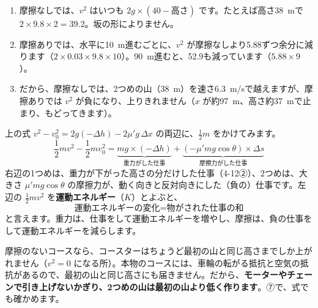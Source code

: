 \begin{enumerate}[label={\bkcircled{\arabic*}}, leftmargin=2.4\zw, itemsep=1pt, topsep=2pt]
\item 摩擦なしでは、$v^2$ はいつも $2g\times(40-\text{高さ})$ です。たとえば高さ\qty{38}{m}で $2\times9.8\times2=39.2$。坂の形によりません。
\item 摩擦ありでは、水平に\qty{10}{m}進むごとに、$v^2$ が摩擦なしより5.88ずつ余分に減ります（$2\times0.03\times9.8\times10$）。\qty{90}{m}進むと、52.9も減っています（$5.88\times9$）。
\item だから、摩擦なしでは、2つめの山（\qty{38}{m}）を速さ\qty{6.3}{m/s}で越えますが、摩擦ありでは $v^2$ が負になり、上りきれません（$x$ が約\qty{97}{m}、高さ約\qty{37}{m}で止まり、もどってきます）。
\end{enumerate}

上の式 $v^2-v_0^2=2g(-\Delta h)-2\mu'g\,\Delta x$ の両辺に、$\tfrac{1}{2}m$ をかけてみます。
\[\frac{1}{2}mv^2-\frac{1}{2}mv_0^2=\underbrace{mg\times(-\Delta h)}_{\text{重力がした仕事}}+\underbrace{(-\mu'mg\cos\theta)\times\Delta s}_{\text{摩擦力がした仕事}}\]
右辺の1つめは、重力が下がった高さの分だけした仕事（\mbox{4-12②}）、2つめは、大きさ $\mu'mg\cos\theta$ の摩擦力が、動く向きと反対向きにした（負の）仕事です。左辺の $\tfrac{1}{2}mv^2$ を\textbf{運動エネルギー}（$K$）とよぶと、
\[\text{運動エネルギーの変化}=\text{物がされた仕事の和}\]
と言えます。重力は、仕事をして運動エネルギーを増やし、摩擦は、負の仕事をして運動エネルギーを減らします。

摩擦のないコースなら、コースターはちょうど最初の山と同じ高さまでしか上がれません（$v^2=0$ になる所）。本物のコースには、車輪の転がる抵抗と空気の抵抗があるので、最初の山と同じ高さにも届きません。だから、\textbf{モーターやチェーンで引き上げないかぎり、2つめの山は最初の山より低く作ります}。⑦で、式でも確かめます。

\begin{phmodel}[坂を区切った計算]
\end{phmodel}
\phkokomade

